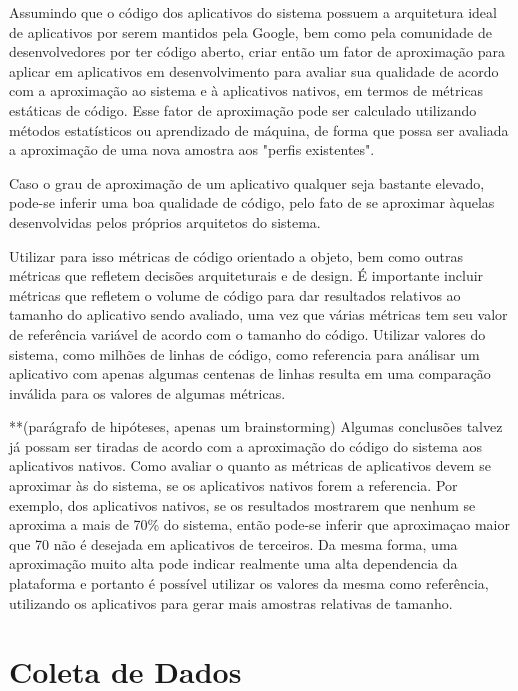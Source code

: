 Assumindo que o código dos aplicativos do sistema possuem a arquitetura ideal de aplicativos por serem mantidos pela Google, bem como pela comunidade de desenvolvedores por ter código aberto, criar então um fator de aproximação para aplicar em aplicativos em desenvolvimento para avaliar sua qualidade de acordo com a aproximação ao sistema e à aplicativos nativos, em termos de métricas estáticas de código. Esse fator de aproximação pode ser calculado utilizando métodos estatísticos ou aprendizado de máquina, de forma que possa ser avaliada a aproximação de uma nova amostra aos "perfis existentes".

Caso o grau de aproximação de um aplicativo qualquer seja bastante elevado, pode-se inferir uma boa qualidade de código, pelo fato de se aproximar àquelas desenvolvidas pelos próprios arquitetos do sistema.

Utilizar para isso métricas de código orientado a objeto, bem como outras métricas que refletem decisões arquiteturais e de design. É importante incluir métricas que refletem o volume de código para dar resultados relativos ao tamanho do aplicativo sendo avaliado, uma vez que várias métricas tem seu valor de referência variável de acordo com o tamanho do código. Utilizar valores do sistema, como milhões de linhas de código, como referencia para análisar um aplicativo com apenas algumas centenas de linhas resulta em uma comparação inválida para os valores de algumas métricas.

**(parágrafo de hipóteses, apenas um brainstorming)
Algumas conclusões talvez já possam ser tiradas de acordo com a aproximação do código do sistema aos aplicativos nativos. Como avaliar o quanto as métricas de aplicativos devem se aproximar às do sistema, se os aplicativos nativos forem a referencia. Por exemplo, dos aplicativos nativos, se os resultados mostrarem que nenhum se aproxima a mais de 70\% do sistema, então pode-se inferir que aproximaçao maior que 70 não é desejada em aplicativos de terceiros. Da mesma forma, uma aproximação muito alta pode indicar realmente uma alta dependencia da plataforma e portanto é possível utilizar os valores da mesma como referência, utilizando os aplicativos para gerar mais amostras relativas de tamanho.

\section{Coleta de Dados}

